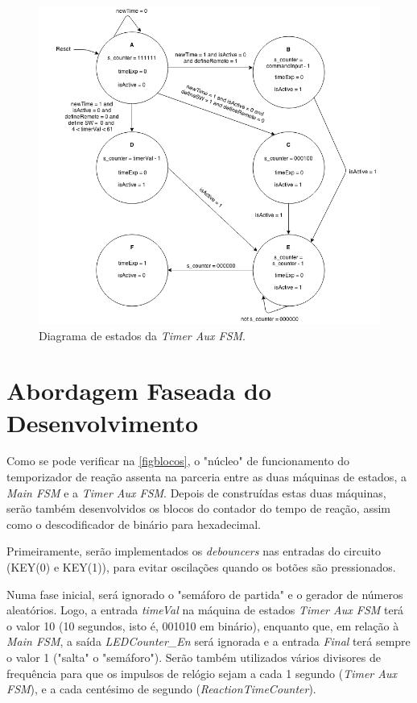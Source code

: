 \documentclass[a4paper,11pt,onecolumn]{report}
\begin{document}
\begin{figure}[h]
\centerline{\includegraphics[scale=0.33]{Images/TimerAuxFSMDiagram}}
\caption{Diagrama de estados da \textit{Timer Aux FSM}.}
\label{figtimerfsm}
\end{figure}


\pagebreak

\section{Abordagem Faseada do Desenvolvimento}
Como se pode verificar na \autoref{figblocos}, o "núcleo" de funcionamento do temporizador de reação assenta na parceria entre as duas máquinas de estados, a \textit{Main FSM} e a \textit{Timer Aux FSM}. Depois de construídas estas duas máquinas, serão também desenvolvidos os blocos do contador do tempo de reação, assim como o descodificador de binário para hexadecimal.

Primeiramente, serão implementados os \textit{debouncers} nas entradas do circuito (KEY(0) e KEY(1)), para evitar oscilações quando os botões são pressionados.

Numa fase inicial, será ignorado o "semáforo de partida" e o gerador de números aleatórios. Logo, a entrada \textit{timeVal} na máquina de estados \textit{Timer Aux FSM} terá o valor 10 (10 segundos, isto é, 001010 em binário), enquanto que, em relação à \textit{Main FSM}, a saída \textit{LEDCounter\_En} será ignorada e a entrada \textit{Final} terá sempre o valor 1 ("salta" o "semáforo"). Serão também utilizados vários divisores de frequência para que os impulsos de relógio sejam a cada 1 segundo (\textit{Timer Aux FSM}), e a cada centésimo de segundo (\textit{ReactionTimeCounter}).
\end{document}
